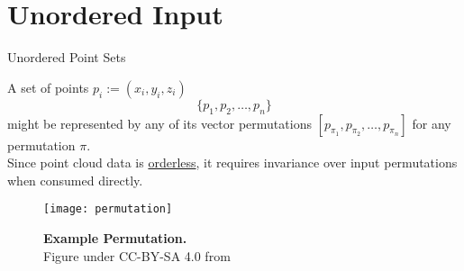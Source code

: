 \section{Unordered Input}
\begin{frame}[c]{Unordered Point Sets}
    \large
    \begin{multicols}{2}
        A set of points $p_i := (x_i, y_i, z_i)$
        $$ \{ p_1, p_2, \ldots, p_n\} $$
        \vspace{1em}
        might be represented by any of its vector permutations $ [ p_{\pi_1}, p_{\pi_2}, \ldots, p_{\pi_n} ] $ for any permutation $\pi$. \\
        \vspace{1em}
        Since point cloud data is \underline{orderless}, it requires
        invariance over input permutations when consumed directly.
        \vspace{2em}
        \begin{figure}
            \centering
            \texttt{[image: permutation]}
            \caption{\textbf{Example Permutation.} \\Figure under CC-BY-SA 4.0 from \cite{BibEntry2022Jun2}}
        \end{figure}
    \end{multicols}
\end{frame}


